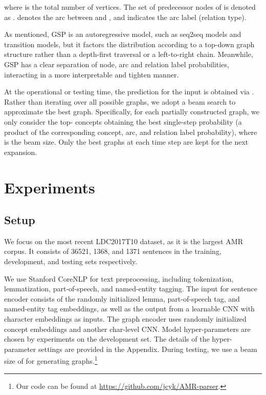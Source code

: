 \documentclass[11pt,a4paper]{article}
\begin{document}
	where  is the total number of vertices. The set of predecessor nodes of  is denoted as .  denotes the arc between  and , and  indicates the arc label (relation type).
	
	As mentioned, GSP is an autoregressive model, such as seq2seq models and transition models, but it factors the distribution according to a top-down graph structure rather than a depth-first traversal or a left-to-right chain. Meanwhile, GSP has a clear separation of node, arc and relation label probabilities, interacting in a more interpretable and tighten manner.
	
	At the operational or testing time, the prediction for the input  is obtained via . Rather than iterating over all possible graphs, we adopt a beam search to approximate the best graph. Specifically, for each partially constructed graph, we only consider the top- concepts obtaining the best single-step probability (a product of the corresponding concept, arc, and relation label probability), where  is the beam size. Only the best  graphs at each time step are kept for the next expansion.
	\section{Experiments}
	\subsection{Setup}
	We focus on the most recent LDC2017T10 dataset, as it is the largest AMR corpus. It consists of 36521, 1368, and 1371 sentences in the training, development, and testing sets respectively.
	
	We use Stanford CoreNLP \cite{manning2014stanford} for text preprocessing, including tokenization, lemmatization, part-of-speech, and named-entity tagging. The input for sentence encoder consists of the randomly initialized lemma, part-of-speech tag, and named-entity tag embeddings, as well as the output from a learnable CNN with character embeddings as inputs. The graph encoder uses randomly initialized concept embeddings and another char-level CNN. Model hyper-parameters are chosen by experiments on the development set. The details of the hyper-parameter settings are provided in the Appendix. During testing, we use a beam size of  for generating graphs.\footnote{Our code can be found at \url{https://github.com/jcyk/AMR-parser}.}
\end{document}
